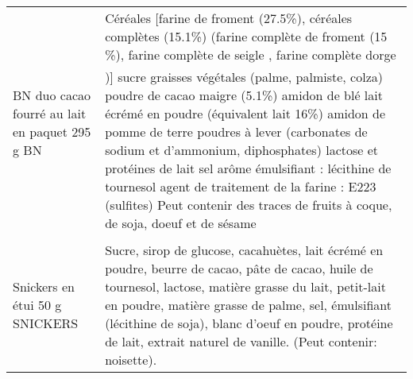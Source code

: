\begin{longtable}{p{5cm}p{10cm}}
                                                           BN duo cacao fourré au lait en paquet 295 g BN &                                                                                                                                                                                                                                                                                                                                                                                                                                 Céréales [farine de froment (27.5\%), céréales complètes (15.1\%) (farine complète de froment (15 \%), farine complète de seigle , farine complète dorge )] sucre graisses végétales (palme, palmiste, colza) poudre de cacao maigre (5.1\%) amidon de blé lait écrémé en poudre (équivalent lait 16\%) amidon de pomme de terre poudres à lever (carbonates de sodium et d'ammonium, diphosphates) lactose et protéines de lait sel arôme émulsifiant : lécithine de tournesol agent de traitement de la farine : E223 (sulfites)  Peut contenir des traces de fruits à coque, de soja, doeuf et de sésame \\
                                                                           Snickers en étui 50 g SNICKERS &                                                                                                                                                                                                                                                                                                                                                                                                                                                                                                                                                                                                                                                                                                   Sucre, sirop de glucose, cacahuètes, lait écrémé en poudre, beurre de cacao, pâte de cacao, huile de tournesol, lactose, matière grasse du lait, petit-lait en poudre, matière grasse de palme, sel, émulsifiant (lécithine de soja), blanc d'oeuf en poudre, protéine de lait, extrait naturel de vanille. (Peut contenir: noisette). \\

\end{longtable}
